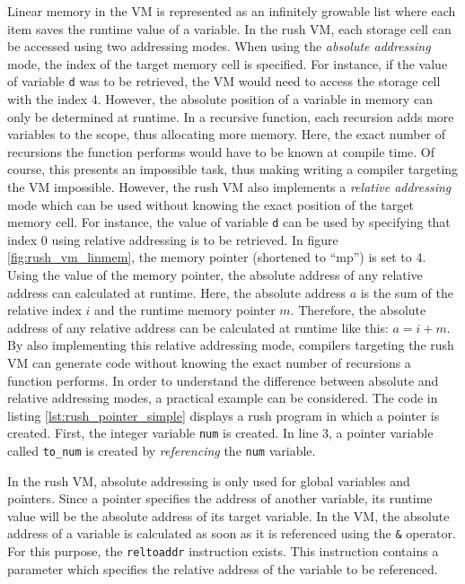 Linear memory in the VM is represented as an infinitely growable list where each item saves the runtime value of a variable.
In the rush VM, each storage cell can be accessed using two addressing modes.
When using the \emph{absolute addressing} mode, the index of the target memory cell is specified.
For instance, if the value of variable \texttt{d} was to be retrieved, the VM would need to access the storage cell with the index 4.
However, the absolute position of a variable in memory can only be determined at runtime.
In a recursive function, each recursion adds more variables to the scope, thus allocating more memory.
Here, the exact number of recursions the function performs would have to be known at compile time.
Of course, this presents an impossible task, thus making writing a compiler targeting the VM impossible.
However, the rush VM also implements a \emph{relative addressing} mode which can be used without knowing the exact position of the target memory cell.
For instance, the value of variable \texttt{d} can be used by specifying that index 0 using relative addressing is to be retrieved.
In figure \ref{fig:rush_vm_linmem}, the memory pointer (shortened to \enquote{mp}) is set to 4.
Using the value of the memory pointer, the absolute address of any relative address can calculated at runtime.
Here, the absolute address $a$ is the sum of the relative index $i$ and the runtime memory pointer $m$.
Therefore, the absolute address of any relative address can be calculated at runtime like this: $a = i + m$.
By also implementing this relative addressing mode,
compilers targeting the rush VM can generate code without knowing the exact number of recursions a function performs.
In order to understand the difference between absolute and relative addressing modes, a practical example can be considered.
The code in listing \ref{lst:rush_pointer_simple} displays a rush program in which a pointer is created.
First, the integer variable \texttt{num} is created.
In line 3, a pointer variable called \texttt{to\_num} is created by \emph{referencing} the \texttt{num} variable.


In the rush VM, absolute addressing is only used for global variables and pointers.
Since a pointer specifies the address of another variable, its runtime value will be the absolute address of its target variable.
In the VM, the absolute address of a variable is calculated as soon as it is referenced using the \texttt{\&} operator.
For this purpose, the \texttt{reltoaddr} instruction exists.
This instruction contains a parameter which specifies the relative address of the variable to be referenced.


